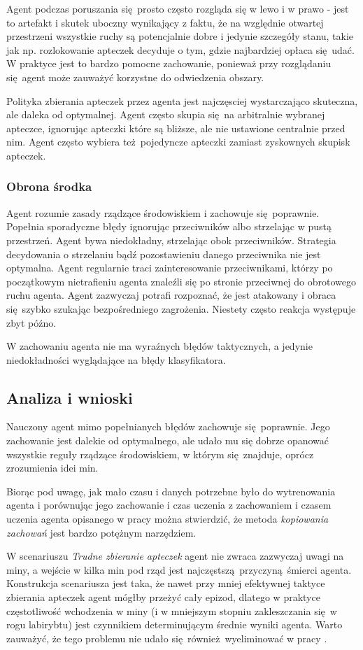 Agent podczas poruszania się prosto często rozgląda się w lewo i w prawo - jest to artefakt i skutek uboczny wynikający z faktu, że na względnie otwartej przestrzeni wszystkie ruchy są potencjalnie dobre i jedynie szczegóły stanu, takie jak np. rozlokowanie apteczek decyduje o tym, gdzie najbardziej opłaca się udać. W praktyce jest to bardzo pomocne zachowanie, ponieważ przy rozglądaniu się agent może zauważyć korzystne do odwiedzenia obszary.

Polityka zbierania apteczek przez agenta jest najczęsciej wystarczająco skuteczna, ale daleka od optymalnej. Agent często skupia się na arbitralnie wybranej apteczce, ignorując apteczki które są bliższe, ale nie ustawione centralnie przed nim. Agent często wybiera też pojedyncze apteczki zamiast zyskownych skupisk apteczek.

\subsubsection{Obrona środka}
Agent rozumie zasady rządzące środowiskiem i zachowuje się poprawnie. Popełnia sporadyczne błędy ignorując przeciwników albo strzelając w pustą przestrzeń. Agent bywa niedokładny, strzelając obok przeciwników. Strategia decydowania o strzelaniu bądź pozostawieniu danego przeciwnika nie jest optymalna. Agent regularnie traci zainteresowanie przeciwnikami, którzy po początkowym nietrafieniu agenta znaleźli się po stronie przeciwnej do obrotowego ruchu agenta. Agent zazwyczaj potrafi rozpoznać, że jest atakowany i obraca się szybko szukając bezpośredniego zagrożenia. Niestety często reakcja występuje zbyt późno.

W zachowaniu agenta nie ma wyraźnych błędów taktycznych, a jedynie niedokładności wyglądające na błędy klasyfikatora.

\subsection{Analiza i wnioski}
Nauczony agent mimo popełnianych błędów zachowuje się poprawnie. Jego zachowanie jest dalekie od optymalnego, ale udało mu się dobrze opanować wszystkie reguły rządzące środowiskiem, w którym się znajduje, oprócz zrozumienia idei min.

Biorąc pod uwagę, jak mało czasu i danych potrzebne było do wytrenowania agenta i porównując jego zachowanie i czas uczenia z zachowaniem i czasem uczenia agenta opisanego w pracy \cite{DBLP:journals/corr/KempkaWRTJ16} można stwierdzić, że metoda \textit{kopiowania zachowań} jest bardzo potężnym narzędziem. 

W scenariuszu \textit{Trudne zbieranie apteczek} agent nie zwraca zazwyczaj uwagi na miny, a wejście w kilka min pod rząd jest najczęstszą przyczyną śmierci agenta. Konstrukcja scenariusza jest taka, że nawet przy mniej efektywnej taktyce zbierania apteczek agent mógłby przeżyć cały epizod, dlatego w praktyce częstotliwość wchodzenia w miny (i w mniejszym stopniu zakleszczania się w rogu labirybtu) jest czynnikiem determinującym średnie wyniki agenta. Warto zauważyć, że tego problemu nie udało się również wyeliminować w pracy \cite{DBLP:journals/corr/KempkaWRTJ16}.
